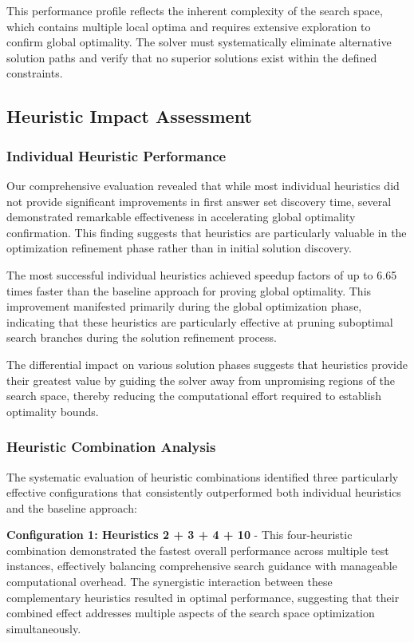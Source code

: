 \documentclass[11pt,a4paper]{article}
\begin{document}
This performance profile reflects the inherent complexity of the search space, which contains multiple local optima and requires extensive exploration to confirm global optimality. The solver must systematically eliminate alternative solution paths and verify that no superior solutions exist within the defined constraints.

\subsection{Heuristic Impact Assessment}

\subsubsection{Individual Heuristic Performance}

Our comprehensive evaluation revealed that while most individual heuristics did not provide significant improvements in first answer set discovery time, several demonstrated remarkable effectiveness in accelerating global optimality confirmation. This finding suggests that heuristics are particularly valuable in the optimization refinement phase rather than in initial solution discovery.

The most successful individual heuristics achieved speedup factors of up to 6.65 times faster than the baseline approach for proving global optimality. This improvement manifested primarily during the global optimization phase, indicating that these heuristics are particularly effective at pruning suboptimal search branches during the solution refinement process.

The differential impact on various solution phases suggests that heuristics provide their greatest value by guiding the solver away from unpromising regions of the search space, thereby reducing the computational effort required to establish optimality bounds.

\subsubsection{Heuristic Combination Analysis}

The systematic evaluation of heuristic combinations identified three particularly effective configurations that consistently outperformed both individual heuristics and the baseline approach:

\textbf{Configuration 1: Heuristics 2 + 3 + 4 + 10} - This four-heuristic combination demonstrated the fastest overall performance across multiple test instances, effectively balancing comprehensive search guidance with manageable computational overhead. The synergistic interaction between these complementary heuristics resulted in optimal performance, suggesting that their combined effect addresses multiple aspects of the search space optimization simultaneously.
\end{document}
